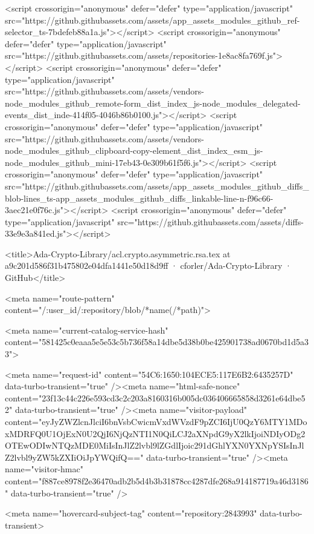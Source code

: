 <script crossorigin="anonymous" defer="defer" type="application/javascript" src="https://github.githubassets.com/assets/app_assets_modules_github_ref-selector_ts-7bdefeb88a1a.js"></script>
<script crossorigin="anonymous" defer="defer" type="application/javascript" src="https://github.githubassets.com/assets/repositories-1e8ac8fa769f.js"></script>
<script crossorigin="anonymous" defer="defer" type="application/javascript" src="https://github.githubassets.com/assets/vendors-node_modules_github_remote-form_dist_index_js-node_modules_delegated-events_dist_inde-414f05-4046b86b0100.js"></script>
<script crossorigin="anonymous" defer="defer" type="application/javascript" src="https://github.githubassets.com/assets/vendors-node_modules_github_clipboard-copy-element_dist_index_esm_js-node_modules_github_mini-17eb43-0e309b61f5f6.js"></script>
<script crossorigin="anonymous" defer="defer" type="application/javascript" src="https://github.githubassets.com/assets/app_assets_modules_github_diffs_blob-lines_ts-app_assets_modules_github_diffs_linkable-line-n-f96c66-3aec21e0f76c.js"></script>
<script crossorigin="anonymous" defer="defer" type="application/javascript" src="https://github.githubassets.com/assets/diffs-33e9e3a841ed.js"></script>
  

  <title>Ada-Crypto-Library/acl.crypto.asymmetric.rsa.tex at a9c201d586f31b475802e04dfa1441e50d18d9ff · cforler/Ada-Crypto-Library · GitHub</title>



  <meta name="route-pattern" content="/:user_id/:repository/blob/*name(/*path)">

    
  <meta name="current-catalog-service-hash" content="581425c0eaaa5e5e53c5b736f58a14dbe5d38b0be425901738ad0670bd1d5a33">


  <meta name="request-id" content="54C6:1650:104ECE5:117E6B2:6435257D" data-turbo-transient="true" /><meta name="html-safe-nonce" content="23f13c44c226e593cd3c2c203a8160316b005dc036406665858d3261e64dbe52" data-turbo-transient="true" /><meta name="visitor-payload" content="eyJyZWZlcnJlciI6bnVsbCwicmVxdWVzdF9pZCI6IjU0QzY6MTY1MDoxMDRFQ0U1OjExN0U2QjI6NjQzNTI1N0QiLCJ2aXNpdG9yX2lkIjoiNDIyODg2OTEwODIwNTQzMDE0MiIsInJlZ2lvbl9lZGdlIjoic291dGhlYXN0YXNpYSIsInJlZ2lvbl9yZW5kZXIiOiJpYWQifQ==" data-turbo-transient="true" /><meta name="visitor-hmac" content="f887ce8978f2e36470adb2b5d4b3b31878cc4287dfe268a914187719a46d3186" data-turbo-transient="true" />


    <meta name="hovercard-subject-tag" content="repository:2843993" data-turbo-transient>


